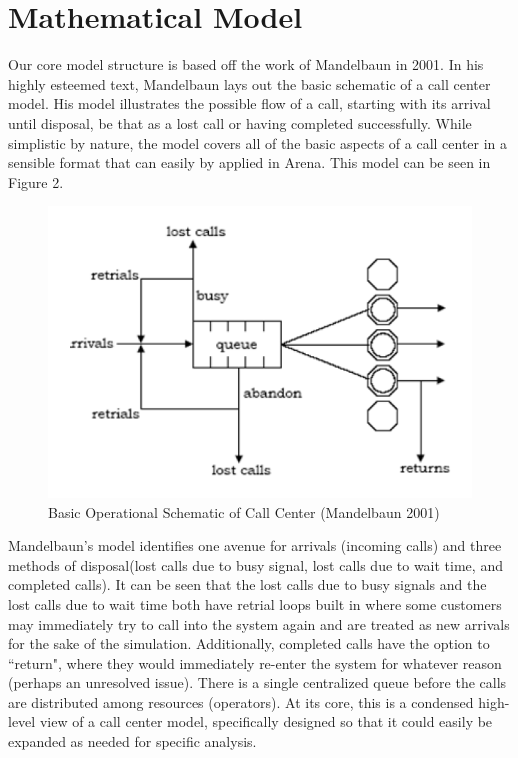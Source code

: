 \documentclass[12pt,twocolumn]{article}
\begin{document}
\section{Mathematical Model}

Our core model structure is based off the work of Mandelbaun in 2001\cite{mandelbaun}.  In his highly esteemed text, Mandelbaun lays out the basic schematic of a call center model.  His model illustrates the possible flow of a call, starting with its arrival until disposal, be that as a lost call or having completed successfully.  While simplistic by nature, the model covers all of the basic aspects of a call center in a sensible format that can easily by applied in Arena.  This model can be seen in Figure 2.  

	\begin{figure}[h]
	\includegraphics[scale=.45]{call_center_layout.png}
	\caption{Basic Operational Schematic of Call Center (Mandelbaun 2001)}
	\end{figure}

Mandelbaun's model identifies one avenue for arrivals (incoming calls) and three methods of disposal(lost calls due to busy signal, lost calls due to wait time, and completed calls).  It can be seen that the lost calls due to busy signals and the lost calls due to wait time both have retrial loops built in where some customers may immediately try to call into the system again and are treated as new arrivals for the sake of the simulation.  Additionally, completed calls have the option to ``return", where they would immediately re-enter the system for whatever reason (perhaps an unresolved issue).  There is a single centralized queue before the calls are distributed among resources (operators).  At its core, this is a condensed high-level view of a call center model, specifically designed so that it could easily be expanded as needed for specific analysis.
\end{document}
